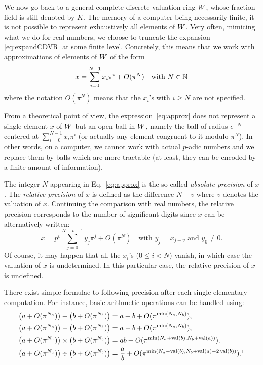\documentclass{article}
\DeclareMathOperator{\val}{val}
\begin{document}
We now go back to a general complete discrete valuation ring $W$, 
whose fraction field is still denoted by $K$.
The memory of a computer being necessarily finite, it is not possible to 
represent exhaustively all elements of $W$. Very often, mimicing 
what we do for real numbers, we choose to truncate the expansion 
\eqref{eq:expandCDVR} at some finite level. Concretely, this means 
that we work with approximations of elements of $W$ of the form
\begin{equation}
\label{eq:approx}
x = \sum_{i=0}^{N-1} x_i \pi^i + O(\pi^N) \quad \text{with } N \in \mathbb N
\end{equation}
where the notation $O(\pi^N)$ means that the $x_i$'s with $i \geq N$ are 
not specified.

\begin{rem}
\label{rem:balls}
From a theoretical point of view, the expression~\eqref{eq:approx}
does not represent a single element $x$ of $W$ but an open ball in
$W$, namely the ball of radius $e^{-N}$ centered at $\sum_{i=0}^{N-1} 
x_i \pi^i$ (or actually any element congruent to it modulo $\pi^N$).
In other words, on a computer, we cannot work with actual $p$-adic
numbers and we replace them by balls which are more tractable (at
least, they can be encoded by a finite amount of information).
\end{rem}

The integer $N$ appearing in Eq.~\eqref{eq:approx} is the so-called 
\emph{absolute precision} of $x$. The \emph{relative precision} of $x$ 
is defined as the difference $N-v$ where $v$ denotes the valuation of 
$x$. Continuing the comparison with real numbers, the relative precision 
corresponds to the number of significant digits since $x$ can be 
alternatively written:
$$x = p^v \sum_{j=0}^{N-v-1} y_j \pi^j + O(\pi^N)
\quad \text{with } y_j = x_{j+v} \text{ and } y_0 \neq 0.$$
Of course, it may happen that all the $x_i$'s ($0 \leq i < N$) vanish,
in which case the valuation of $x$ is undetermined. In this particular
case, the relative precision of $x$ is undefined.

There exist simple formulae to following precision after each single
elementary computation. For instance, basic arithmetic operations can
be handled using:
\begin{align}
\big(a + O(\pi^{N_a})\big) + \big(b + O(\pi^{N_b})\big) 
& = a + b + O(\pi^{\min(N_a,N_b)}), 
\label{eq:precadd} \\
\big(a + O(\pi^{N_a})\big) - \big(b + O(\pi^{N_b})\big) 
& = a - b + O(\pi^{\min(N_a,N_b)}), 
\label{eq:precsub} \\
\big(a + O(\pi^{N_a})\big) \times \big(b + O(\pi^{N_b})\big) 
& = ab + O(\pi^{\min(N_a + \val(b), N_b + \val(a))}).
\label{eq:precmul} \\
\big(a + O(\pi^{N_a})\big) \div \big(b + O(\pi^{N_b})\big) 
& = \frac a b + O(\pi^{\min(N_a - \val(b), N_b + \val(a) - 2 \val(b))}).\footnotemark
\label{eq:precdiv} 
\end{align}
\end{document}

